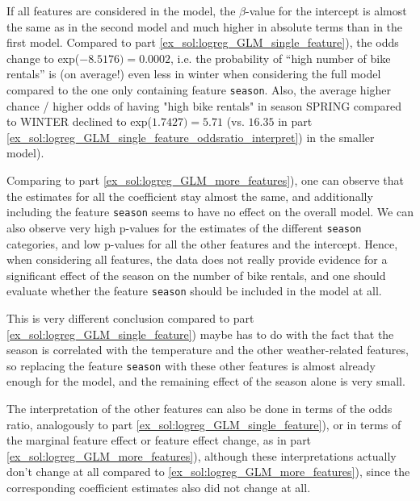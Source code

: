 {\begin{enumerate}[a)]
	If all features are considered in the model, the $\beta$-value for the intercept is almost the same as in the second model and much higher in absolute terms than in the first model.
    Compared to part \ref{ex_sol:logreg_GLM_single_feature}), the odds change to exp($-8.5176) = 0.0002$, i.e. the probability of ``high number of bike rentals'' is (on average!) even less in winter when considering the full model compared to the one only containing feature \texttt{season}. Also, the average higher chance / higher odds of having "high bike rentals" in season SPRING compared to WINTER declined to exp($1.7427)=5.71$ (vs. $16.35$ in part \ref{ex_sol:logreg_GLM_single_feature_oddsratio_interpret}) in the smaller model).

    Comparing to part \ref{ex_sol:logreg_GLM_more_features}), one can observe that the estimates for all the coefficient stay almost the same, and additionally including the feature \texttt{season} seems to have no effect on the overall model.
    We can also observe very high p-values for the estimates of the different \texttt{season} categories, and low p-values for all the other features and the intercept.
    Hence, when considering all features, the data does not really provide evidence for a significant effect of the season on the number of bike rentals, and one should evaluate whether the feature \texttt{season} should be included in the model at all.
    
    This is very different conclusion compared to part \ref{ex_sol:logreg_GLM_single_feature})
    maybe has to do with the fact that the season is correlated with the temperature and the other weather-related features, so replacing the feature \texttt{season} with these other features is almost already enough for the model, and the remaining effect of the season alone is very small.

    The interpretation of the other features can also be done in terms of the odds ratio, analogously to part \ref{ex_sol:logreg_GLM_single_feature}), or in terms of the marginal feature effect or feature effect change, as in part \ref{ex_sol:logreg_GLM_more_features}), although these interpretations actually don't change at all compared to \ref{ex_sol:logreg_GLM_more_features}), since the corresponding coefficient estimates also did not change at all.

\end{enumerate}
}

